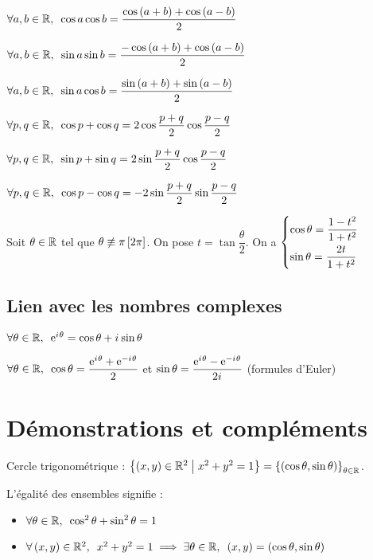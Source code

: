 \(\quantifs{\forall a,b\in\R}\cos a\cos b=\dfrac{\cos\paren{a+b}+\cos\paren{a-b}}{2}\)

\(\quantifs{\forall a,b\in\R}\sin a\sin b=\dfrac{-\cos\paren{a+b}+\cos\paren{a-b}}{2}\)

\(\quantifs{\forall a,b\in\R}\sin a\cos b=\dfrac{\sin\paren{a+b}+\sin\paren{a-b}}{2}\)

\(\quantifs{\forall p,q\in\R}\cos p+\cos q=2\cos\dfrac{p+q}{2}\cos\dfrac{p-q}{2}\)

\(\quantifs{\forall p,q\in\R}\sin p+\sin q=2\sin\dfrac{p+q}{2}\cos\dfrac{p-q}{2}\)

\(\quantifs{\forall p,q\in\R}\cos p-\cos q=-2\sin\dfrac{p+q}{2}\sin\dfrac{p-q}{2}\)

Soit \(\theta\in\mathbb{R}\) tel que \(\theta\not\equiv\pi\left[2\pi\right]\). On pose \(t=\tan\dfrac{\theta}{2}\). On a \(\begin{dcases}\cos\theta=\dfrac{1-t^2}{1+t^2} \\ \sin\theta=\dfrac{2t}{1+t^2}\end{dcases}\)

\subsection{Lien avec les nombres complexes}

\(\quantifs{\forall\theta\in\R}\e{\i\theta}=\cos\theta+\i\sin\theta\)

\(\quantifs{\forall\theta\in\R}\cos\theta=\dfrac{\e{\i\theta}+\e{-\i\theta}}{2}\) et \(\sin\theta=\dfrac{\mathrm{e}^{i\mkern1mu\theta}-\mathrm{e}^{-i\mkern1mu\theta}}{2i\mkern1mu}\) (formules d'Euler)

\section{Démonstrations et compléments}

Cercle trigonométrique : \(\left\lbrace\left(x,y\right)\in\mathbb{R}^2\;\middle|\; x^2+y^2=1\right\rbrace=\left\lbrace\left(\cos\theta,\sin\theta\right)\right\rbrace_{\theta\in\mathbb{R}}\).

\begin{rem}
L'égalité des ensembles signifie :

\begin{itemize}
\item[\increc] \(\quantifs{\forall\theta\in\R}\cos^2\theta+\sin^2\theta=1\)

\item[\incdir] \(\quantifs{\forall\paren{x,y}\in\R^2}x^2+y^2=1\imp\quantifs{\exists\theta\in\R}\paren{x,y}=\paren{\cos\theta,\sin\theta}\)
\end{itemize}
\end{rem}

